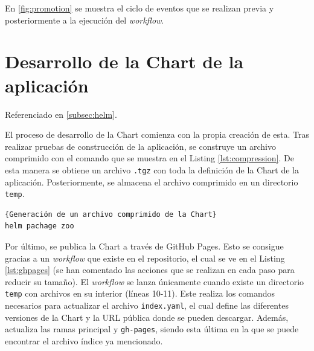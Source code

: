 En \ref{fig:promotion} se muestra el ciclo de eventos que se realizan previa y posteriormente a la ejecución del \textit{workflow}.


\section{Desarrollo de la Chart de la aplicación}
\label{sec:chart}

Referenciado en \ref{subsec:helm}.

El proceso de desarrollo de la Chart comienza con la propia creación de esta. Tras realizar pruebas de construcción de la aplicación, se construye un archivo comprimido con el comando que se muestra en el Listing \ref{lst:compression}. De esta manera se obtiene un archivo \texttt{.tgz} con toda la definición de la Chart de la aplicación. Posteriormente, se almacena el archivo comprimido en un directorio \texttt{temp}.

\begin{lstlisting}[language=bash,label=lst:compression]{Generación de un archivo comprimido de la Chart}
helm pachage zoo
\end{lstlisting}

Por último, se publica la Chart a través de GitHub Pages. Esto se consigue gracias a un \textit{workflow} que existe en el repositorio, el cual se ve en el Listing \ref{lst:ghpages} (se han comentado las acciones que se realizan en cada paso para reducir su tamaño). El \textit{workflow} se lanza únicamente cuando existe un directorio \texttt{temp} con archivos en su interior (líneas 10-11). Este realiza los comandos necesarios para actualizar el archivo \texttt{index.yaml}, el cual define las diferentes versiones de la Chart y la URL pública donde se pueden descargar. Además, actualiza las ramas principal y \texttt{gh-pages}, siendo esta última en la que se puede encontrar el archivo índice ya mencionado.

